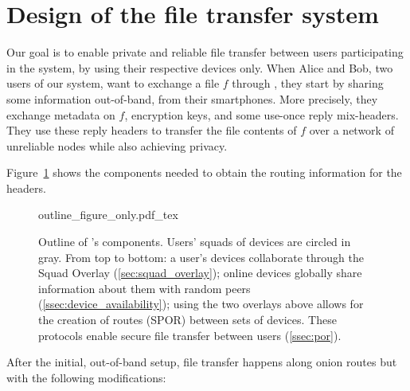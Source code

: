 
\section{Design of the \name file transfer system}%
\label{design}


Our goal is to enable private and reliable file transfer between users 
participating in the system, by using their respective devices only.
When Alice and Bob, two users of our system, want to exchange a file \(f\) 
through \name, they start by sharing some information out-of-band, \eg from 
their smartphones.
More precisely, they exchange metadata on \(f\), encryption keys, and
some use-once reply mix-headers.
They use these reply headers to transfer the file contents of \(f\) over a 
network of unreliable nodes while also achieving privacy.

Figure~\ref{fig:outline} shows the components needed to obtain the
routing information for the headers.  

\begin{figure}[t]
  \centering
  \def\svgwidth{0.8\columnwidth}
  {outline_figure_only.pdf_tex}
  \caption{\label{fig:outline}%
    Outline of \name's components. Users' squads of devices are circled in gray. 
    From top to bottom: a user's devices collaborate through the Squad Overlay 
    (\cref{sec:squad_overlay}); online devices globally share information about 
    them with random peers (\cref{ssec:device_availability}); using the two 
    overlays above allows for the creation of routes (\ac{SPOR}) between sets of devices. 
    These protocols enable secure file transfer between users 
    (\cref{ssec:por}).}
\end{figure}

After the initial, out-of-band setup, file transfer happens along
onion routes but with the following \name modifications:

